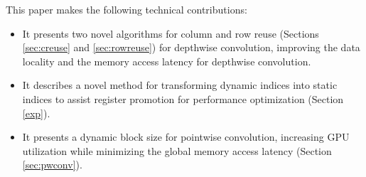 This paper makes the following technical contributions:
\begin{itemize}
    \item It presents two novel algorithms for column and row reuse (Sections \ref{sec:creuse} and \ref{sec:rowreuse}) for depthwise
        convolution, improving the data locality and the memory access latency for depthwise convolution.
    \item It describes a novel method for transforming dynamic indices into static indices to assist register promotion for performance
        optimization (Section \ref{exp}).
    \item It presents a dynamic block size for pointwise convolution, increasing GPU utilization while minimizing the global memory
        access latency (Section \ref{sec:pwconv}).
\end{itemize}
